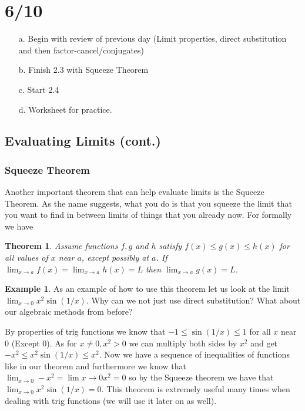 \documentclass[12pt,reqno]{article}
\newtheorem{Theorem}{Theorem}
\theoremstyle{definition}
\newtheorem*{Example}{Example}
\begin{document}
	
	


\section{6/10}
\begin{enumerate}
	\item[a.] Begin with review of previous day (Limit properties, direct substitution and then factor-cancel/conjugates) 
	\item[b.] Finish 2.3 with Squeeze Theorem 
	\item[c.] Start 2.4
	\item[d.] Worksheet for practice.
\end{enumerate}

\subsection{Evaluating Limits (cont.)} 
\subsubsection{Squeeze Theorem}

Another important theorem that can help evaluate limits is the Squeeze Theorem. As the name suggests, what you do is that you squeeze the limit that you want to find in between limits of things that you already now. For formally we have 
\begin{Theorem}
	Assume functions $f, g$ and $h$ satisfy $f(x) \leq g(x) \leq h(x)$ for all values of $x$ near $a$, except possibly at $a$. If $\lim_{x \to a} f(x) = \lim_{x\to a} h(x) = L$ then $\lim_{x \to a} g(x) = L$. 
\end{Theorem}

\begin{Example}
	As an example of how to use this theorem let us look at the limit $\lim_{ x\to 0} x^2 \sin(1/x)$. Why can we not just use direct substitution? What about our algebraic methods from before? 
	
	By properties of trig functions we know that $-1 \leq \sin(1/x) \leq 1$ for all $x$ near 0 (Except 0). As for $x \neq 0, x^2 > 0$ we can multiply both sides by $x^2$ and get $-x^2 \leq x^2\sin(1/x) \leq x^2$. Now we have a sequence of inequalities of functions like in our theorem and furthermore we know that $\lim_{x \to 0} -x^2  = \lim{x \to 0} x^2 = 0$ so by the Squeeze theorem we have that $\lim_{x \to 0} x^2 \sin(1/x) = 0.$ This theorem is extremely useful many times when dealing with trig functions (we will use it later on as well). 
\end{Example}
\end{document}
